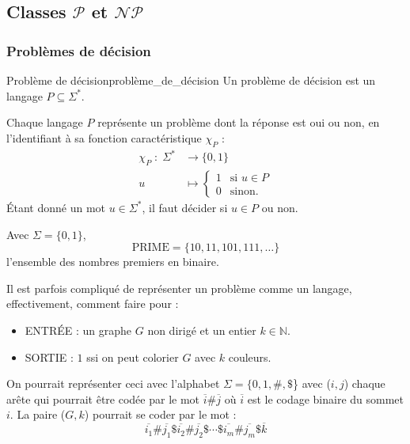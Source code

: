 \subsection{Classes $\mathcal{P}$ et $\mathcal{NP}$}

\subsubsection{Problèmes de décision}
\label{sub:problemes_de_decision}

\begin{definition}{Problème de décision}{problème_de_décision}
  Un problème de décision est un langage $P\subseteq\Sigma^*$.
\end{definition}
\begin{remark}
    Chaque langage $P$ représente un problème dont la réponse est oui ou non, en l'identifiant à sa fonction caractéristique
    $\chi_P$ :
    \begin{equation*}
        \begin{aligned}
            \chi_P\; :\; \Sigma^* &\rightarrow \{0,1\} \\
            u &\mapsto \begin{cases}
                1 & \text{si } u \in P \\
                0 & \text{sinon.}
            \end{cases}
        \end{aligned}
    \end{equation*}
    Étant donné un mot $u\in \Sigma^*$, il faut décider si $u\in P$ ou non.
\end{remark}
\begin{example}
    Avec $\Sigma = \{0,1\}$,
    \begin{equation*}
        \text{PRIME} = \{10,11,101,111,\dots\} 
    \end{equation*}
    l'ensemble des nombres premiers en binaire.
\end{example}
Il est parfois compliqué de représenter un problème comme un langage, effectivement, comment faire pour :
\begin{itemize}[label=\textbullet]
    \item ENTRÉE : un graphe $G$ non dirigé et un entier $k\in\mathbb{N}$.
    \item SORTIE : $1$ ssi on peut colorier $G$ avec $k$ couleurs.
\end{itemize}
On pourrait représenter ceci avec l'alphabet $\Sigma = \{0,1,\#,\$$\} avec ($i,j$) chaque arête qui pourrait être codée par 
le mot $\overline{i}\#\overline{j}$ où $\overline{i}$ est le codage binaire du sommet $i$. La paire ($G,k$) pourrait se 
coder par le mot :
\begin{equation*}
    \overline{i_1}\#\overline{j_1}\$\overline{i_2}\#\overline{j_2}\$\cdots\$\overline{i_m}\#\overline{j_m}\$\overline{k}
\end{equation*}

